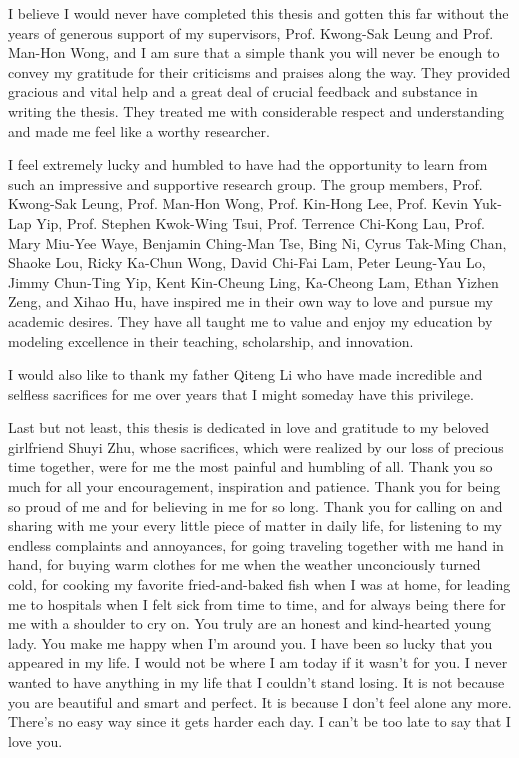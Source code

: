 I believe I would never have completed this thesis and gotten this far without the years of generous support of my supervisors, Prof. Kwong-Sak Leung and Prof. Man-Hon Wong, and I am sure that a simple thank you will never be enough to convey my gratitude for their criticisms and praises along the way. They provided gracious and vital help and a great deal of crucial feedback and substance in writing the thesis. They treated me with considerable respect and understanding and made me feel like a worthy researcher.

I feel extremely lucky and humbled to have had the opportunity to learn from such an impressive and supportive research group. The group members, Prof. Kwong-Sak Leung, Prof. Man-Hon Wong, Prof. Kin-Hong Lee, Prof. Kevin Yuk-Lap Yip, Prof. Stephen Kwok-Wing Tsui, Prof. Terrence Chi-Kong Lau, Prof. Mary Miu-Yee Waye, Benjamin Ching-Man Tse, Bing Ni, Cyrus Tak-Ming Chan, Shaoke Lou, Ricky Ka-Chun Wong, David Chi-Fai Lam, Peter Leung-Yau Lo, Jimmy Chun-Ting Yip, Kent Kin-Cheung Ling, Ka-Cheong Lam, Ethan Yizhen Zeng, and Xihao Hu, have inspired me in their own way to love and pursue my academic desires. They have all taught me to value and enjoy my education by modeling excellence in their teaching, scholarship, and innovation.

I would also like to thank my father Qiteng Li who have made incredible and selfless sacrifices for me over years that I might someday have this privilege. 

Last but not least, this thesis is dedicated in love and gratitude to my beloved girlfriend Shuyi Zhu, whose sacrifices, which were realized by our loss of precious time together, were for me the most painful and humbling of all. Thank you so much for all your encouragement, inspiration and patience. Thank you for being so proud of me and for believing in me for so long. Thank you for calling on and sharing with me your every little piece of matter in daily life, for listening to my endless complaints and annoyances, for going traveling together with me hand in hand, for buying warm clothes for me when the weather unconciously turned cold, for cooking my favorite fried-and-baked fish when I was at home, for leading me to hospitals when I felt sick from time to time, and for always being there for me with a shoulder to cry on. You truly are an honest and kind-hearted young lady. You make me happy when I'm around you. I have been so lucky that you appeared in my life. I would not be where I am today if it wasn't for you. I never wanted to have anything in my life that I couldn't stand losing. It is not because you are beautiful and smart and perfect. It is because I don't feel alone any more. There's no easy way since it gets harder each day. I can't be too late to say that I love you.
